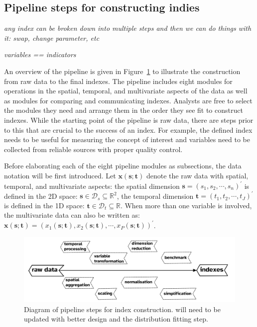 \documentclass[
]{article}
\begin{document}
\newpage

\hypertarget{pipeline-steps-for-constructing-indies}{%
\subsection{Pipeline steps for constructing
indies}\label{pipeline-steps-for-constructing-indies}}

\emph{any index can be broken down into multiple steps and then we can
do things with it: swap, change parameter, etc}

\emph{variables == indicators}

An overview of the pipeline is given in Figure~\ref{fig-pipeline-steps}
to illustrate the construction from raw data to the final indexes. The
pipeline includes eight modules for operations in the spatial, temporal,
and multivariate aspects of the data as well as modules for comparing
and communicating indexes. Analysts are free to select the modules they
need and arrange them in the order they see fit to construct indexes.
While the starting point of the pipeline is raw data, there are steps
prior to this that are crucial to the success of an index. For example,
the defined index needs to be useful for measuring the concept of
interest and variables need to be collected from reliable sources with
proper quality control.

Before elaborating each of the eight pipeline modules as subsections,
the data notation will be first introduced. Let
\(\mathbf{x}(\mathbf{s};\mathbf{t})\) denote the raw data with spatial,
temporal, and multivariate aspects: the spatial dimension
\(\mathbf{s} = (s_1, s_2, \cdots, s_n)^\prime\) is defined in the 2D
space: \(\mathbf{s} \in \mathcal{D}_s \subseteq \mathbb{R}^2\), the
temporal dimension \(\mathbf{t} = (t_1, t_2, \cdots, t_J)^\prime\) is
defined in the 1D space:
\(\mathbf{t} \in \mathcal{D}_t \subseteq \mathbb{R}\). When more than
one variable is involved, the multivariate data can also be written as:
\(\mathbf{x}(\mathbf{s}; \mathbf{t}) = (x_1(\mathbf{s}; \mathbf{t}), x_2(\mathbf{s}; \mathbf{t}), \cdots, x_P(\mathbf{s}; \mathbf{t}))^\prime\).

\begin{figure}

{\centering \includegraphics[width=1\textwidth,height=0.9\textheight]{../figures/pipeline-steps.png}

}

\caption{\label{fig-pipeline-steps}Diagram of pipeline steps for index
construction. will need to be updated with better design and the
distribution fitting step.}

\end{figure}
\end{document}
